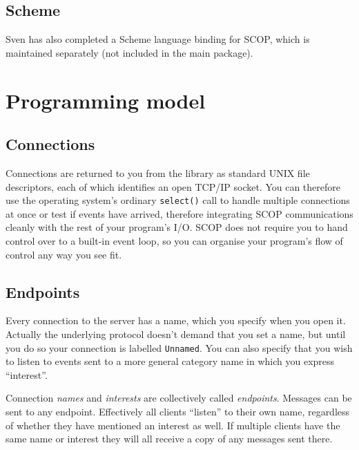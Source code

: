 \documentclass[12pt,a4paper,twoside]{article}
\renewcommand{\_}{\texttt{\symbol{95}}}
\begin{document}
\subsection{Scheme}

Sven has also completed a Scheme language binding for SCOP, which
is maintained separately (not included in the main package).

\section{Programming model}

\subsection{Connections}


Connections are returned to you from the library as standard UNIX file
descriptors, each of which identifies an open TCP/IP socket. You can
therefore use the operating system's ordinary \texttt{select()} call to
handle multiple connections at once or test if events have arrived,
therefore integrating SCOP communications cleanly with the rest of your
program's I/O. SCOP does not require you to hand control over to a
built-in event loop, so you can organise your program's flow of control
any way you see fit.

\subsection{Endpoints}

Every connection to the server has a name, which you
specify when you open it. Actually the underlying protocol doesn't
demand that you set a name, but until you do so your connection
is labelled \texttt{Unnamed}. You can also specify that you wish
to listen to events sent to a more general category name in which you
express ``interest''.

Connection \textit{names} and \textit{interests} are collectively
called \textit{endpoints}. Messages can be sent to any endpoint.
Effectively all clients ``listen'' to their own name, regardless of
whether they have mentioned an interest as well. If multiple clients
have the same name or interest they will all receive a copy of any
messages sent there.
\end{document}

